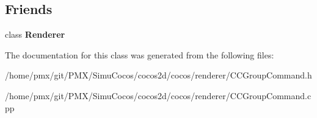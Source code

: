 \subsection*{Friends}
\begin{DoxyCompactItemize}
\item 
\mbox{\label{classGroupCommandManager_a7482e5338f9824f1190a0846d209c666}} 
class {\bfseries Renderer}
\end{DoxyCompactItemize}


The documentation for this class was generated from the following files\+:\begin{DoxyCompactItemize}
\item 
/home/pmx/git/\+P\+M\+X/\+Simu\+Cocos/cocos2d/cocos/renderer/C\+C\+Group\+Command.\+h\item 
/home/pmx/git/\+P\+M\+X/\+Simu\+Cocos/cocos2d/cocos/renderer/C\+C\+Group\+Command.\+cpp\end{DoxyCompactItemize}

